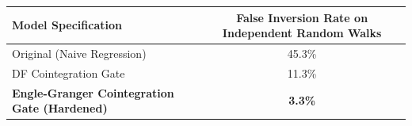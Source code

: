\begin{tabular}{lc}
\hline
\textbf{Model Specification} & \textbf{False Inversion Rate on Independent Random Walks} \\
\hline
Original (Naive Regression) & 45.3\% \\
DF Cointegration Gate & 11.3\% \\
\textbf{Engle-Granger Cointegration Gate (Hardened)} & \textbf{3.3\%} \\
\hline
\end{tabular}
